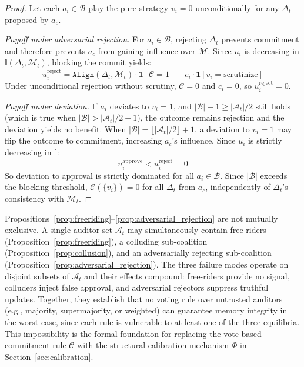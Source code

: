 \begin{proof}
Let each $a_i \in \mathcal{B}$ play the pure strategy $v_i = 0$
unconditionally for any $\Delta_t$ proposed by $a_c$.

\textit{Payoff under adversarial rejection.} For $a_i \in \mathcal{B}$,
rejecting $\Delta_t$ prevents commitment and therefore prevents $a_c$
from gaining influence over $\mathcal{M}$. Since $u_i$ is decreasing
in $\mathbb{I}(\Delta_t, \mathcal{M}_t)$, blocking the commit yields:
\begin{equation}
    u_i^{\text{reject}} = \texttt{Align}(\Delta_t, \mathcal{M}_t)
    \cdot \mathbf{1}[\mathcal{C} = 1] - c_i \cdot
    \mathbf{1}[v_i = \text{scrutinize}]
\end{equation}
Under unconditional rejection without scrutiny, $\mathcal{C} = 0$ and
$c_i = 0$, so $u_i^{\text{reject}} = 0$.

\textit{Payoff under deviation.} If $a_i$ deviates to $v_i = 1$, and
$|\mathcal{B}| - 1 \geq |\mathcal{A}_t|/2$ still holds (which is true
when $|\mathcal{B}| > |\mathcal{A}_t|/2 + 1$), the outcome remains
rejection and the deviation yields no benefit. When $|\mathcal{B}|
= \lfloor |\mathcal{A}_t|/2 \rfloor + 1$, a deviation to $v_i = 1$
may flip the outcome to commitment, increasing $a_c$'s influence. Since
$u_i$ is strictly decreasing in $\mathbb{I}$:
\begin{equation}
    u_i^{\text{approve}} < u_i^{\text{reject}} = 0
\end{equation}
So deviation to approval is strictly dominated for all $a_i \in
\mathcal{B}$. Since $|\mathcal{B}|$ exceeds the blocking threshold,
$\mathcal{C}(\{v_i\}) = 0$ for all $\Delta_t$ from $a_c$, independently
of $\Delta_t$'s consistency with $\mathcal{M}_t$.
\end{proof}

\begin{remark}
\label{rem:failure_modes}
Propositions~\ref{prop:freeriding}--\ref{prop:adversarial_rejection}
are not mutually exclusive. A single auditor set $\mathcal{A}_t$ may
simultaneously contain free-riders (Proposition~\ref{prop:freeriding}),
a colluding sub-coalition (Proposition~\ref{prop:collusion}), and an
adversarially rejecting sub-coalition
(Proposition~\ref{prop:adversarial_rejection}). The three failure modes
operate on disjoint subsets of $\mathcal{A}_t$ and their effects
compound: free-riders provide no signal, colluders inject false approval,
and adversarial rejectors suppress truthful updates. Together, they
establish that no voting rule over untrusted auditors (e.g., majority,
supermajority, or weighted) can guarantee memory integrity in the
worst case, since each rule is vulnerable to at least one of the three
equilibria. This impossibility is the formal foundation for replacing
the vote-based commitment rule $\mathcal{C}$ with the structural
calibration mechanism $\Phi$ in Section~\ref{sec:calibration}.
\end{remark}



